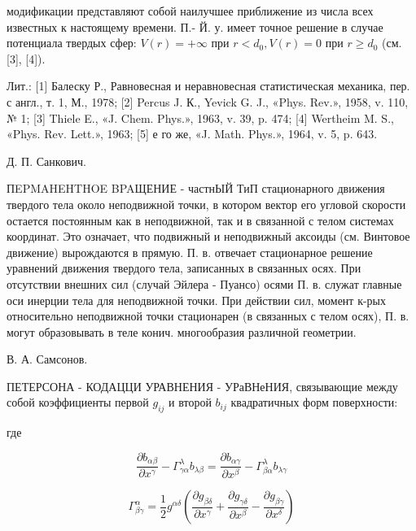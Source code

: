 \documentclass[10pt]{article}
\begin{document}
модификации представляют собой наилучшее приближение из числа всех известных к настоящему времени. П.- Й. у. имеет точное решение в случае потенциала твердых сфер: $V(r)=+\infty$ при $r<d_{0}, V(r)=0$ при $r \geqslant d_{0}$ (см. [3], [4]).



Лит.: [1] Балеску Р., Равновесная и неравновесная статистическая механика, пер. с англ., т. 1, М., 1978; [2] Percus J. К., Yevick G. J., «Phys. Rev.», 1958, v. 110, № 1; [3] Thiele E., «J. Chem. Phys.», 1963, v. 39, p. 474; [4] Wertheim M. S., «Phys. Rev. Lett.», 1963; [5] е го же, «J. Math. Phys.», 1964, v. 5, p. 643.



Д. П. Санкович.



ПEPMAHEHTHOE BPAЩЕНИЕ - частнЫЙ ТиП стационарного движения твердого тела около неподвижной точки, в котором вектор его угловой скорости остается постоянным как в неподвижной, так и в связанной с телом системах координат. Это означает, что подвижный и неподвижный аксоиды (см. Винтовое движение) вырождаются в прямую. П. в. отвечает стационарное решение уравнений движения твердого тела, записанных в связанных осях. При отсутствии внешних сил (случай Эйлера - Пуансо) осями П. в. служат главные оси инерции тела для неподвижной точки. При действии сил, момент к-рых относительно неподвижной точки стационарен (в связанных с телом осях), П. в. могут образовывать в теле конич. многообразия различной геометрии.



В. А. Самсонов.



ПЕТЕРСОНА - КОДАЦЦИ УРАВНЕНИЯ - УРаВНеНИЯ, связывающие между собой коэффициенты первой $g_{i j}$ и второй $b_{i j}$ квадратичных форм поверхности:



где



\[

\frac{\partial b_{\alpha \beta}}{\partial x^{\gamma}}-\Gamma_{\gamma \alpha}^{\lambda} b_{\lambda \beta}=\frac{\partial b_{\alpha \gamma}}{\partial x^{\beta}}-\Gamma_{\beta \alpha}^{\lambda} b_{\lambda \gamma}

\]



\[

\Gamma_{\beta \gamma}^{\alpha}=\frac{1}{2} g^{\alpha \delta}\left(\frac{\partial g_{\beta \delta}}{\partial x^{\gamma}}+\frac{\partial g_{\gamma \delta}}{\partial x^{\beta}}-\frac{\partial g_{\beta \gamma}}{\partial x^{\delta}}\right)

\]
\end{document}
